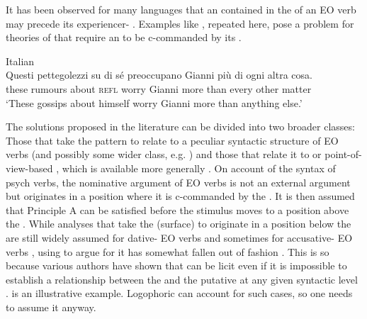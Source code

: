 \documentclass[output=paper,colorlinks,citecolor=brown]{langscibook}
\begin{document}
It has been observed for many languages that an  contained in the  of an EO verb may precede its experiencer-  \parencites[see, among many others, for Italian][]{belletti_psych-verbs_1988}[for English][]{pesetsky_zero_1995}[for Chinese][]{cheung_psych_2015}. %
Examples like , repeated here, pose a problem for theories of  that require an  to be c-commanded by its .
\begin{exe}
     Italian \citep[312]{belletti_psych-verbs_1988}\\
    \gll Questi pettegolezzi {su di} sé preoccupano Gianni più di ogni altra cosa.\\
                these rumours about \textsc{refl} worry Gianni more than every other matter\\
        \glt ‘These gossips about himself worry Gianni more than anything else.’
\end{exe}
The solutions proposed in the literature can be divided into two broader classes: Those that take the  pattern to relate to a peculiar syntactic structure of EO verbs (and possibly some wider class, e.g. \citealp{belletti_psych-verbs_1988,pesetsky_zero_1995,cheung_psych_2015}) and those that relate it to  or point-of-view-based , which is available more generally \parencite[e.g.][]{pollard_anaphors_1992,bouchard_semantics_1995}.
On  account of the syntax of psych verbs, the nominative argument of EO verbs is not an external argument but originates in a position where it is c-commanded by the .
It is then assumed that Principle A can be satisfied before the stimulus moves to a position above the .
While analyses that take the (surface)  to originate in a position below the  are still widely assumed for dative- EO verbs and sometimes for accusative- EO verbs \citep[see the overview in][]{rozwadowska_psych_2020}, using  to argue for it has somewhat fallen out of fashion \citep[see, e.g.][]{landau_locative_2010,hirsch_german_2018}.
This is so because various authors have shown that  can be licit even if it is impossible to establish a  relationship between the  and the putative  at any given syntactic level \citep[see e.g.][]{pollard_anaphors_1992,bouchard_semantics_1995,cancado_exceptional_1999}.
 is an illustrative example.
Logophoric  can account for such cases, so one needs to assume it anyway.
\end{document}
